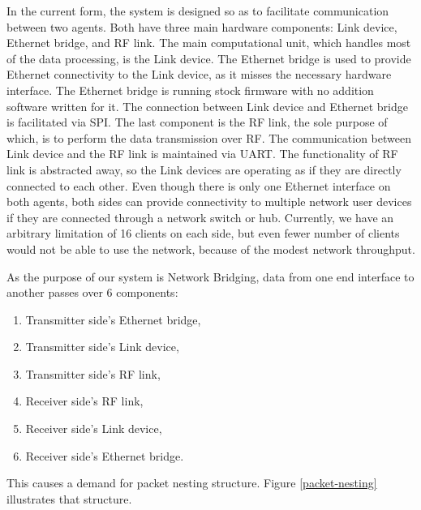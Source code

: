 In the current form, the system is designed so as to facilitate communication between two agents. Both have three main hardware components: Link device, Ethernet bridge, and RF link. The main computational unit, which handles most of the data processing, is the Link device. The Ethernet bridge is used to provide Ethernet connectivity to the Link device, as it misses the necessary hardware interface. The Ethernet bridge is running stock firmware with no addition software written for it. 
The connection between Link device and Ethernet bridge is facilitated via SPI. The last component is the RF link, the sole purpose of which, is to perform the data transmission over RF. The communication between Link device and the RF link is maintained via UART. The functionality of RF link is abstracted away, so the Link devices are operating as if they are directly connected to each other. Even though there is only one Ethernet interface on both agents, both sides can provide connectivity to multiple network user devices if they are connected through a network switch or hub. Currently, we have an arbitrary limitation of 16 clients on each side, but even fewer number of clients would not be able to use the network, because of the modest network throughput.


As the purpose of our system is Network Bridging, data from one end interface to another passes over 6 components:
\begin{enumerate}[nolistsep]
    \item Transmitter side's Ethernet bridge,
    \item Transmitter side's Link device,
    \item Transmitter side's RF link,
    \item Receiver side's RF link,
    \item Receiver side's Link device,
    \item Receiver side's Ethernet bridge.
\end{enumerate}

This causes a demand for packet nesting structure. Figure \ref{packet-nesting} illustrates that structure.

